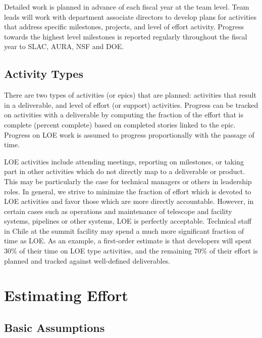 
Detailed work is planned in advance of each fiscal year at the team level.
Team leads will work with department associate directors to develop plans for activities that address specific milestones, projects, and level of effort activity.
Progress towards the highest level milestones is reported regularly throughout the fiscal year to SLAC, AURA, NSF and DOE.


\subsection{Activity Types}
\label{sec:loe}

There are two types of activities (or epics) that are planned:  activities that result in a deliverable, and level of effort (or support) activities.
Progress can be tracked on activities with a deliverable by computing the fraction of the effort that is complete (percent complete) based on completed stories linked to the epic.
Progress on \gls{LOE} work is assumed to progress proportionally with the passage of time.

\gls{LOE} activities include attending meetings, reporting on milestones, or taking part in other activities which do not directly map to a deliverable or product.
This may be particularly the case for technical managers or others in leadership roles.
In general, we strive to minimize the fraction of effort which is devoted to \gls{LOE} activities and favor those which are more directly accountable.
However, in certain cases such as operations and maintenance of telescope and facility systems, pipelines or other systems, \gls{LOE} is perfectly acceptable.
Technical staff in Chile at the summit facility may spend a much more significant fraction of time as \gls{LOE}.
As an example, a first-order estimate is that developers will spent 30\% of their time on \gls{LOE} type activities, and the remaining 70\% of their effort is planned and tracked against well-defined deliverables.


\section{Estimating Effort}
\label{sec:effort}

\subsection{Basic Assumptions}

